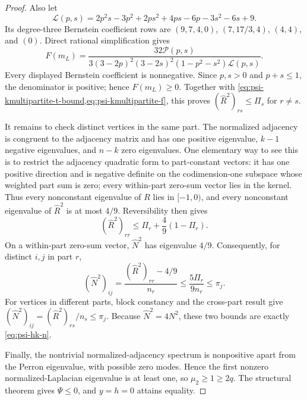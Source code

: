 \documentclass[11pt]{article}
\begin{document}
\begin{proof}
{}
Also let
\begin{equation}
 \mathcal L(p,s)
 =2p^2s-3p^2+2ps^2+4ps-6p-3s^2-6s+9.
 \label{eq:psi-kmultipartite-l}
\end{equation}
Its degree-three Bernstein coefficient rows are
$(9,7,4,0)$, $(7,17/3,4)$, $(4,4)$, and $(0)$.
Direct rational simplification gives
\begin{equation}
 F(m_L)=
 \frac{32\mathcal P(p,s)}
 {3(3-2p)^2(3-2s)^2(1-p^2-s^2)\mathcal L(p,s)}.
 \label{eq:psi-kmultipartite-bernstein-certificate}
\end{equation}
Every displayed Bernstein coefficient is nonnegative.  Since $p,s>0$ and
$p+s\leq1$, the denominator is positive; hence $F(m_L)\geq0$.
Together with \cref{eq:psi-kmultipartite-t-bound,eq:psi-kmultipartite-f},
this proves $(\widehat R^2)_{rs}\leq\Pi_s$ for $r\neq s$.

It remains to check distinct vertices in the same part.  The normalized
adjacency is congruent to the adjacency matrix and has one positive eigenvalue,
$k-1$ negative eigenvalues, and $n-k$ zero eigenvalues.  One elementary way
to see this is to restrict the adjacency quadratic form to part-constant
vectors: it has one positive direction and is negative definite on the
codimension-one subspace whose weighted part sum is zero; every within-part
zero-sum vector lies in the kernel.  Thus every nonconstant eigenvalue of
$R$ lies in $[-1,0)$, and every nonconstant eigenvalue of
$\widehat R^2$ is at most $4/9$.  Reversibility then gives
\begin{equation}
 (\widehat R^2)_{rr}
 \leq\Pi_r+\frac49(1-\Pi_r).
 \label{eq:psi-kmultipartite-diagonal-covariance}
\end{equation}
On a within-part zero-sum vector, $\widehat N^2$ has eigenvalue $4/9$.
Consequently, for distinct $i,j$ in part $r$,
\begin{equation}
 (\widehat N^2)_{ij}
 =\frac{(\widehat R^2)_{rr}-4/9}{n_r}
 \leq\frac{5\Pi_r}{9n_r}
 \leq\pi_j.
 \label{eq:psi-kmultipartite-same-part}
\end{equation}
For vertices in different parts, block constancy and the cross-part result
give $(\widehat N^2)_{ij}=(\widehat R^2)_{rs}/n_s\leq\pi_j$.
Because $\widehat N^2=4N^2$, these two bounds are exactly
\cref{eq:psi-hk-n}.

Finally, the nontrivial normalized-adjacency spectrum is nonpositive apart
from the Perron eigenvalue, with possible zero modes.  Hence the first
nonzero normalized-Laplacian eigenvalue is at least one, so
$\mu_2\geq1\geq2q$.  The structural theorem gives $\Psi\leq0$, and
$y=h=0$ attains equality.
\end{proof}
\end{document}
